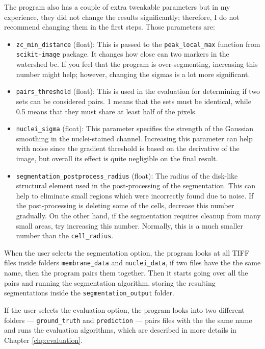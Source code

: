 \documentclass[
  digital,     %
  oneside,     %
  nosansbold,  %
  nocolorbold, %
  lof,         %
  lot,         %
]{fithesis4}
\begin{document}
The program also has a couple of extra tweakable parameters but in my experience,
they did not change the results significantly; therefore, I do not recommend
changing them in the first steps. Those parameters are:
\begin{itemize}
    \item \texttt{zc\_min\_distance} (float): This is passed to the
        \texttt{peak\_local\_max} function from \texttt{scikit-image} package.
        It changes how close can two markers in the watershed be. If you feel
        that the program is over-segmenting, increasing this number might help;
        however, changing the sigmas is a lot more significant.
    \item \texttt{pairs\_threshold} (float): This is used in the evaluation for
        determining if two sets can be considered pairs. 1 means that the sets
        must be identical, while 0.5 means that they must share at least half of
        the pixels.
    \item \texttt{nuclei\_sigma} (float): This parameter specifies the strength
        of the Gaussian smoothing in the nuclei-stained channel. Increasing this
        parameter can help with noise since the gradient threshold is based on the
        derivative of the image, but overall its effect is quite negligible on the
        final result.
    \item \texttt{segmentation\_postprocess\_radius} (float): The radius of the
        disk-like structural element used in the post-processing of the
        segmentation. This can help to eliminate small regions which were
        incorrectly found due to noise. If the post-processing is deleting some of 
        the cells, decrease this number gradually. On the other hand, if the segmentation
        requires cleanup from many small areas, try increasing this number. Normally,
        this is a much smaller number than the \texttt{cell\_radius}.
\end{itemize}

When the user selects the segmentation option, the program looks at all TIFF
files inside folders \texttt{membrane\_data} and \texttt{nuclei\_data}, if two files have the
the same name, then the program pairs them together. Then it starts going over all
the pairs and running the segmentation algorithm, storing the resulting
segmentations inside the \texttt{segmentation\_output} folder.

If the user selects the evaluation option, the program looks into two different
folders --- \texttt{ground\_truth} and \texttt{prediction} --- pairs files with the
the same name and runs the evaluation algorithms, which are described in more
details in Chapter \ref{chp:evaluation}.
\end{document}
